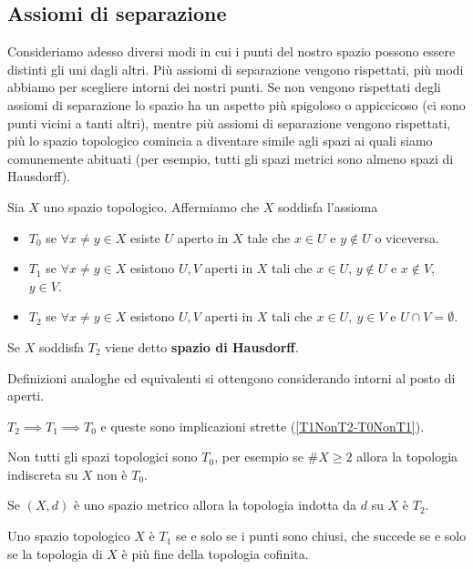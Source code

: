 \begin{multicols*}{2}
\section{Assiomi di separazione}
Consideriamo adesso diversi modi in cui i punti del nostro spazio possono essere distinti gli uni dagli altri. Più assiomi di separazione vengono rispettati, più modi abbiamo per scegliere intorni dei nostri punti. Se non vengono rispettati degli assiomi di separazione lo spazio ha un aspetto più spigoloso o appiccicoso (ci sono punti vicini a tanti altri), mentre più assiomi di separazione vengono rispettati, più lo spazio topologico comincia a diventare simile agli spazi ai quali siamo comunemente abituati (per esempio, tutti gli spazi metrici sono almeno spazi di Hausdorff).
\begin{definition}
Sia $X$ uno spazio topologico. Affermiamo che $X$ soddisfa l'assioma
\begin{itemize}[noitemsep]
\item $T_0$ se $\forall x\neq y\in X$ esiste $U$ aperto in $X$ tale che $x\in U$ e $y\notin U$ o viceversa.
\item $T_1$ se $\forall x\neq y\in X$ esistono $U,V$ aperti in $X$ tali che $x\in U$, $y\notin U$ e $x\notin V$, $y\in V$.
\item $T_2$ se $\forall x\neq y\in X$ esistono $U,V$ aperti in $X$ tali che $x\in U,\ y\in V$ e $U\cap V=\emptyset$.
\end{itemize}
Se $X$ soddisfa $T_2$ viene detto \textbf{spazio di Hausdorff}.
\end{definition}
\begin{remark}
Definizioni analoghe ed equivalenti si ottengono considerando intorni al posto di aperti.
\end{remark}
\begin{remark}
$T_2\implies T_1\implies T_0$ e queste sono implicazioni strette (\ref{T1NonT2-T0NonT1}).
\end{remark}
\begin{remark}
Non tutti gli spazi topologici sono $T_0$, per esempio se $\#X\geq 2$ allora la topologia indiscreta su $X$ non è $T_0$.
\end{remark}

\begin{proposition}\label{MetriciSonoHausdorff}
Se $(X,d)$ è uno spazio metrico allora la topologia indotta da $d$ su $X$ è $T_2$.
\end{proposition}
\begin{proposition}\label{CaratterizzazioneT1}
Uno spazio topologico $X$ è $T_1$ se e solo se i punti sono chiusi, che succede se e solo se la topologia di $X$ è più fine della topologia cofinita.
\end{proposition}


\end{multicols*}

